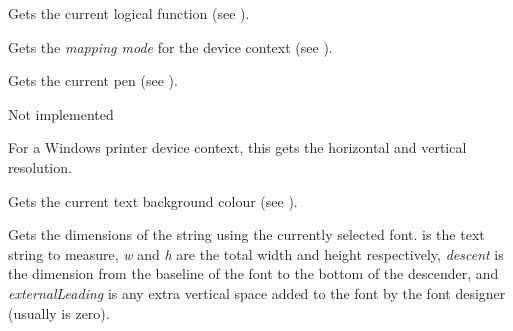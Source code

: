 
Gets the current logical function (see ).

\label{wxsvgfiledcgetmapmode}


Gets the {\it mapping mode} for the device context (see ).

\label{wxsvgfiledcgetpen}



Gets the current pen (see ).

\label{wxsvgfiledcgetpixel}


Not implemented

\label{wxsvgfiledcgetsize}



For a Windows printer device context, this gets the horizontal and vertical
resolution. 

\label{wxsvgfiledcgettextbackground}



Gets the current text background colour (see ).

\label{wxsvgfiledcgettextextent}


Gets the dimensions of the string using the currently selected font.
 is the text string to measure, {\it w} and {\it h} are
the total width and height respectively, {\it descent} is the
dimension from the baseline of the font to the bottom of the
descender, and {\it externalLeading} is any extra vertical space added
to the font by the font designer (usually is zero).


